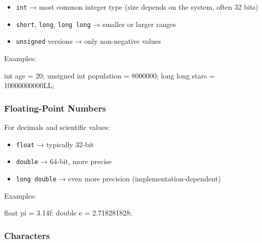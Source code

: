 \documentclass[
  letterpaper,
  DIV=11,
  numbers=noendperiod]{scrreprt}
\newenvironment{Shaded}{\begin{snugshade}}{\end{snugshade}}
\newcommand{\BuiltInTok}[1]{\textcolor[rgb]{0.00,0.23,0.31}{#1}}
\newcommand{\DataTypeTok}[1]{\textcolor[rgb]{0.68,0.00,0.00}{#1}}
\newcommand{\DecValTok}[1]{\textcolor[rgb]{0.68,0.00,0.00}{#1}}
\newcommand{\FloatTok}[1]{\textcolor[rgb]{0.68,0.00,0.00}{#1}}
\newcommand{\NormalTok}[1]{\textcolor[rgb]{0.00,0.23,0.31}{#1}}
\newcommand{\OperatorTok}[1]{\textcolor[rgb]{0.37,0.37,0.37}{#1}}
\providecommand{\tightlist}{%
  \setlength{\itemsep}{0pt}\setlength{\parskip}{0pt}}
\begin{document}
\begin{itemize}
\tightlist
\item
  \texttt{int} → most common integer type (size depends on the system,
  often 32 bits)
\item
  \texttt{short}, \texttt{long}, \texttt{long\ long} → smaller or larger
  ranges
\item
  \texttt{unsigned} versions → only non-negative values
\end{itemize}

Examples:

\begin{Shaded}
\begin{Highlighting}[]
\DataTypeTok{int}\NormalTok{ age }\OperatorTok{=} \DecValTok{20}\OperatorTok{;}
\DataTypeTok{unsigned} \DataTypeTok{int}\NormalTok{ population }\OperatorTok{=} \DecValTok{8000000}\OperatorTok{;}
\DataTypeTok{long} \DataTypeTok{long}\NormalTok{ stars }\OperatorTok{=} \DecValTok{10000000000}\BuiltInTok{LL}\OperatorTok{;}
\end{Highlighting}
\end{Shaded}

\subsubsection{Floating-Point Numbers}\label{floating-point-numbers}

For decimals and scientific values:

\begin{itemize}
\tightlist
\item
  \texttt{float} → typically 32-bit
\item
  \texttt{double} → 64-bit, more precise
\item
  \texttt{long\ double} → even more precision (implementation-dependent)
\end{itemize}

Examples:

\begin{Shaded}
\begin{Highlighting}[]
\DataTypeTok{float}\NormalTok{ pi }\OperatorTok{=} \FloatTok{3.14}\BuiltInTok{f}\OperatorTok{;}
\DataTypeTok{double}\NormalTok{ e }\OperatorTok{=} \FloatTok{2.718281828}\OperatorTok{;}
\end{Highlighting}
\end{Shaded}

\subsubsection{Characters}\label{characters}
\end{document}
